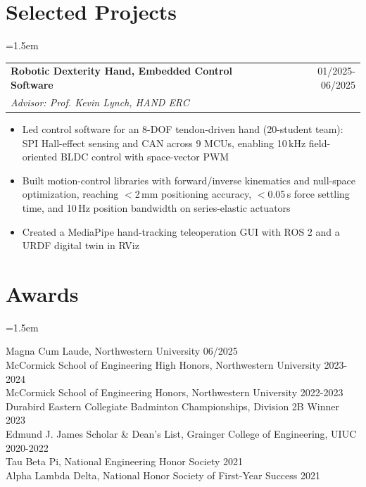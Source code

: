 \documentclass[10pt,letterpaper]{article}
\makeatletter
\newenvironment{block}{\begin{list}{}{\leftmargin=1.5em\rightmargin=0pt\itemsep=0pt\topsep=0pt}\item[]}{\end{list}}
\newenvironment{bullets}{\begin{itemize}[label=$\cdot$,leftmargin=0.9em,itemsep=0pt,parsep=0pt,topsep=-0.3em]}{\end{itemize}\vspace{0.55em}}
\newcommand{\entry}[4]{%
  \begin{tabularx}{\linewidth}{@{}>{\raggedright\arraybackslash}X r@{}}
    \textbf{#1} & #2 \\
    \textit{#3} & \textit{#4}
  \end{tabularx}\par\vspace{0.3em}}
\makeatother
\begin{document}
\section{Selected Projects}
\begin{block}
\entry{Robotic Dexterity Hand, Embedded Control Software}{01/2025-06/2025}{Advisor: Prof. Kevin Lynch, HAND ERC}{}
\begin{bullets}
  \item Led control software for an 8-DOF tendon-driven hand (20-student team): SPI Hall-effect sensing and CAN
        across 9 MCUs, enabling 10\,kHz field-oriented BLDC control with space-vector PWM
  \item Built motion-control libraries with forward/inverse kinematics and null-space optimization, reaching
        $<$2\,mm positioning accuracy, $<$0.05\,s force settling time, and 10\,Hz position bandwidth on series-elastic actuators
  \item Created a MediaPipe hand-tracking teleoperation GUI with ROS 2 and a URDF digital twin in RViz
\end{bullets}


\end{block}

\section{Awards}
\begin{block}
Magna Cum Laude, Northwestern University \hfill 06/2025\\
McCormick School of Engineering High Honors, Northwestern University \hfill 2023-2024\\
McCormick School of Engineering Honors, Northwestern University \hfill 2022-2023\\
Durabird Eastern Collegiate Badminton Championships, Division 2B Winner \hfill 2023\\
Edmund J. James Scholar \& Dean's List, Grainger College of Engineering, UIUC \hfill 2020-2022\\
Tau Beta Pi, National Engineering Honor Society \hfill 2021\\
Alpha Lambda Delta, National Honor Society of First-Year Success \hfill 2021
\end{block}
\end{document}

